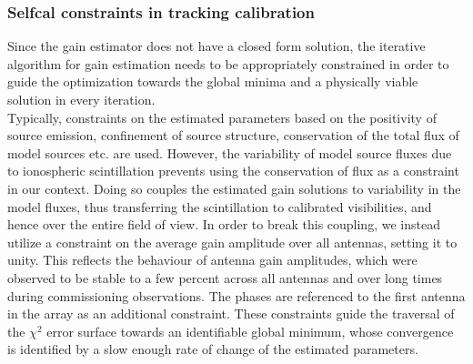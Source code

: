 \documentclass{aa}
\begin{document}
\begin{table}[tbh]
\caption{\label{tab:Details-of-model}Details of  model sources used  for All-sky
 Selfcal.   The $S_{60}$  has  been  generated using  the  spectral indices  of
 \citep{helmboldt2008radio}, while  a secular decrease  in the flux of  CasA of
  -0.8\% has been assumed. }
\end{table}

\subsubsection{Selfcal constraints in tracking calibration}

Since the  gain estimator does  not have a  closed form solution,  the iterative
algorithm for gain estimation needs  to be appropriately constrained in order to
guide  the  optimization towards  the  global  minima  and a  physically  viable
solution in every iteration.\\

Typically, constraints  on the estimated  parameters based on the  positivity of
source emission, confinement of source structure, conservation of the total flux
of model sources etc. are used.  However, the variability of model source fluxes
due to  ionospheric scintillation prevents using  the conservation of  flux as a
constraint  in our context.  Doing so  couples the  estimated gain  solutions to
variability  in  the  model  fluxes,  thus  transferring  the  scintillation  to
calibrated visibilities, and  hence over the entire field of  view.  In order to
break  this  coupling, we  instead  utilize a  constraint  on  the average  gain
amplitude over all antennas, setting it to unity. This reflects the behaviour of
antenna  gain amplitudes,  which were  observed to  be stable  to a  few percent
across all antennas and over  long times during commissioning observations.  The
phases  are referenced  to  the first  antenna  in the  array  as an  additional
constraint.  These  constraints guide  the  traversal  of  the $\chi^{2}$  error
surface towards an identifiable  global minimum, whose convergence is identified
by a slow enough rate of change of the estimated parameters.
\end{document}

